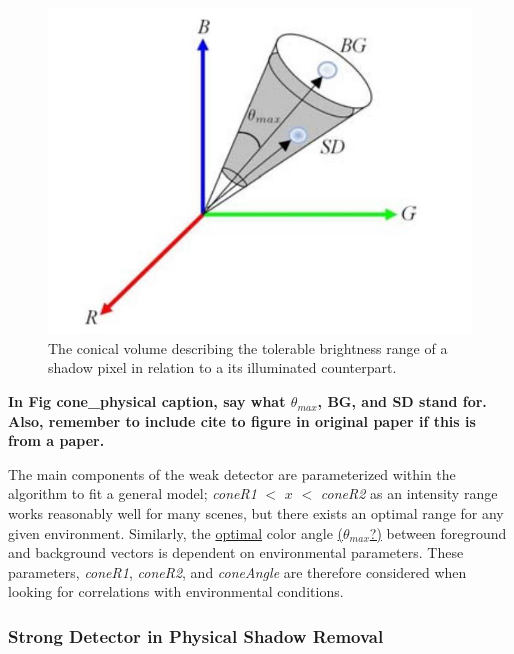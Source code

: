 \documentclass[12pt]{report}
\newcommand{\comment}[1]
           {\par {\bfseries \color{blue} #1 \par}}
\begin{document}
\begin{figure}
  \centering
 \includegraphics[width=.7\linewidth]{figures/cone_physical.jpg}
  \caption{The conical volume describing the tolerable brightness range of a shadow pixel in relation to a its illuminated counterpart.}
  \label{fig:cone_physical}
\end{figure}
\comment{In Fig cone\_physical caption, say what $\theta_{max}$, BG, and SD stand for. Also, remember to include cite to figure in original paper if this is from a paper.}

The main components of the weak detector are parameterized within the algorithm to fit a general model; \textit{coneR1} $<$ $x$ $<$ \textit{coneR2} as an intensity range works reasonably well for many scenes, but there exists an optimal range for any given environment. Similarly, the \underline{optimal} color angle \underline{($\theta_{max}$?)}  between foreground and background vectors is dependent on environmental parameters. These parameters, \textit{coneR1}, \textit{coneR2}, and \textit{coneAngle} are therefore considered when looking for correlations with environmental conditions.

\subsubsection{Strong Detector in Physical Shadow Removal}
\end{document}
